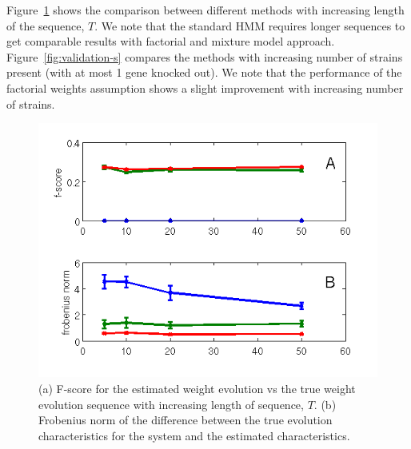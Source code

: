 \documentclass{bioinfo}
\begin{document}
Figure~\ref{fig:validation-t} shows the comparison between different
methods with increasing length of the sequence, $T$. We note that the
standard HMM requires longer sequences to get comparable results with
factorial and mixture model approach. Figure~\ref{fig:validation-s} compares the
methods with increasing number of strains present (with at most 1 gene
knocked out). We note that the performance of the factorial weights
assumption shows a slight improvement with increasing number of
strains. 
\begin{figure}[h]
  \centering
  \includegraphics[scale=0.6]{results/mm_tvar}
  \caption{(a) F-score for the estimated weight evolution vs the true
    weight evolution sequence with increasing length of sequence, $T$. (b) Frobenius norm of the difference between the true
    evolution characteristics for the system and the estimated characteristics. }
  \label{fig:validation-t}
\end{figure}
\end{document}
